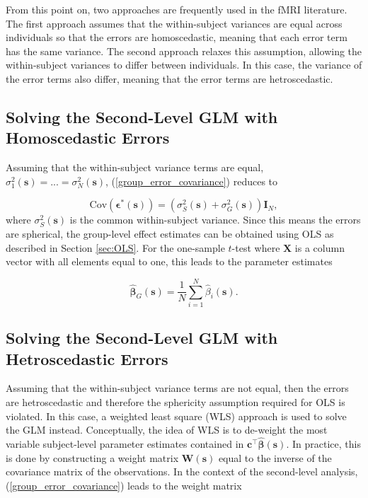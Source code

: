 From this point on, two approaches are frequently used in the fMRI literature. The first approach assumes that the within-subject variances are equal across individuals so that the errors are homoscedastic, meaning that each error term has the same variance. The second approach relaxes this assumption, allowing the within-subject variances to differ between individuals. In this case, the variance of the error terms also differ, meaning that the error terms are hetroscedastic.

\subsection{Solving the Second-Level GLM with Homoscedastic Errors}

Assuming that the within-subject variance terms are equal, $\sigma^{2}_{1}(\bm{s}) = ... = \sigma^{2}_{N}(\bm{s})$, (\ref{group_error_covariance}) reduces to

\begin{equation} 
\label{eq:group_homoscedastic_errors_covariance}
\mathrm{Cov}(\bm{\epsilon}^{*}(\bm{s})) = (\sigma_{S}^{2}(\bm{s}) + \sigma_{G}^{2}(\bm{s}))\bm{I}_{N},
\end{equation}
where $\sigma_{S}^{2}(\bm{s})$ is the common within-subject variance. Since this means the errors are spherical, the group-level effect estimates can be obtained using OLS as described in Section \ref{sec:OLS}. For the one-sample $t$-test where $\bm{X}$ is a column vector with all elements equal to one, this leads to the parameter estimates

\begin{equation} 
\label{eq:homoscedastic_parameter_estimates}
\hat{\bm{\beta}}_{G}(\bm{s}) = \frac{1}{N}\sum_{i=1}^{N} \hat{\beta}_{i}(\bm{s}).
\end{equation}

\subsection{Solving the Second-Level GLM with Hetroscedastic Errors}

Assuming that the within-subject variance terms are not equal, then the errors are hetroscedastic and therefore the sphericity assumption required for OLS is violated. In this case, a weighted least square (WLS) approach is used to solve the GLM instead. Conceptually, the idea of WLS is to de-weight the most variable subject-level parameter estimates contained in $\bm{c}^{\intercal}\hat{\bm{\beta}}(\bm{s})$. In practice, this is done by constructing a weight matrix $\bm{W}(\bm{s})$ equal to the inverse of the covariance matrix of the observations. In the context of the second-level analysis, (\ref{group_error_covariance}) leads to the weight matrix 

